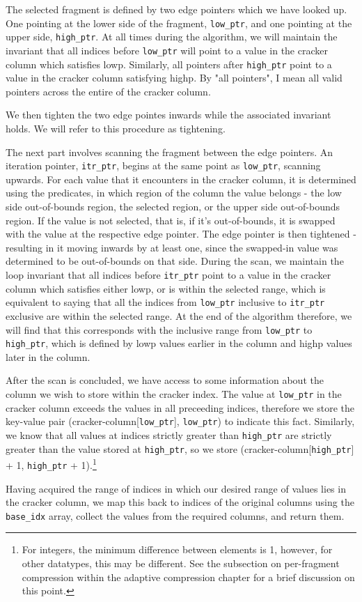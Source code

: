 The selected fragment is defined by two edge pointers which we have looked up. One pointing at the
lower side of the fragment, \texttt{low\_ptr}, and one pointing at the upper side, \texttt{high\_ptr}.
At all times during the algorithm, we will maintain the invariant that all indices before
\texttt{low\_ptr} will point to a value in the cracker column which satisfies lowp. Similarly, all
pointers after \texttt{high\_ptr} point to a value in the cracker column satisfying highp. By "all pointers", I mean all valid pointers across the entire of the cracker column.

We then tighten the two edge pointes inwards while the associated invariant holds. We will refer to
this procedure as tightening.

The next part involves scanning the fragment between the edge pointers. An iteration pointer,
\texttt{itr\_ptr}, begins at the same point as \texttt{low\_ptr}, scanning upwards. For each value that it encounters in the cracker column, it is determined using the predicates, in which region of
the column the value belongs - the low side out-of-bounds region, the selected region, or the upper
side out-of-bounds region. If the value is not selected, that is, if it's out-of-bounds, it is swapped
with the value at the respective edge pointer. The edge pointer is then tightened - resulting in it
moving inwards by at least one, since the swapped-in value was determined to be out-of-bounds on that
side. During the scan, we maintain the loop invariant that all indices before \texttt{itr\_ptr} point
to a value in the cracker column which satisfies either lowp, or is within the selected range, which
is equivalent to saying that all the indices from \texttt{low\_ptr} inclusive to \texttt{itr\_ptr}
exclusive are within the selected range. At the end of the algorithm therefore, we will find that
this corresponds with the inclusive range from \texttt{low\_ptr} to \texttt{high\_ptr}, which is
defined by lowp values earlier in the column and highp values later in the column.

After the scan is concluded, we have access to some information about the column we wish to store
within the cracker index. The value at \texttt{low\_ptr} in the cracker column exceeds the values in all preceeding indices, therefore we store the key-value pair (cracker-column[\texttt{low\_ptr}],
\texttt{low\_ptr}) to indicate this fact. Similarly, we know that all values at indices strictly greater than \texttt{high\_ptr} are strictly greater than the value stored at \texttt{high\_ptr}, so
we store (cracker-column[\texttt{high\_ptr}] + 1, \texttt{high\_ptr} + 1).\footnote{For integers, the
minimum difference between elements is 1, however, for other datatypes, this may be different. See
the subsection on per-fragment compression within the adaptive compression chapter for a brief discussion on this point.}

Having acquired the range of indices in which our desired range of values lies in the cracker column,
we map this back to indices of the original columns using the \texttt{base\_idx} array, collect the
values from the required columns, and return them.
